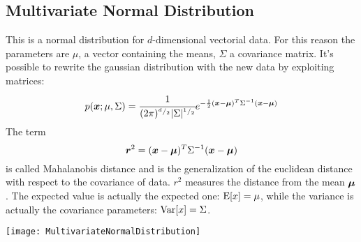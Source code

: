 \subsection{Multivariate Normal Distribution}
This is a normal distribution for $d$-dimensional vectorial data. For this reason the parameters are $\mu$, a vector containing the means, $\Sigma$ a covariance matrix.\newline
It's possible to rewrite the gaussian distribution with the new data by exploiting matrices:
\begin{equation}
	p(\bm{x};\mu,\Sigma)=\cfrac{1}{(2\pi)^{{}^{d}/_{2}}\vert \Sigma \vert^{{}^{1}/_{2}}}e^{-\frac{1}{2}(\bm{x}-\bm{\mu})^T\Sigma^{-1}(\bm{x}-\bm{\mu})}
	\label{eq:MultivariateGaussian}
\end{equation}
The term 
\begin{equation}
	\bm{r}^2=(\bm{x}-\bm{\mu})^T\Sigma^{-1}(\bm{x}-\bm{\mu})
	\label{eq:MahalanobisDistance}
\end{equation}
is called Mahalanobis distance and is the generalization of the euclidean distance with respect to the covariance of data. $r^2$ measures the distance from the mean $\bm{\mu}$.\newline
The expected value is actually the expected one: $\text{E}[x]=\mu$, while the variance is actually the covariance parameters: $\text{Var}[x]=\Sigma$.
\begin{center}
	\texttt{[image: MultivariateNormalDistribution]}
\end{center}

%
%
